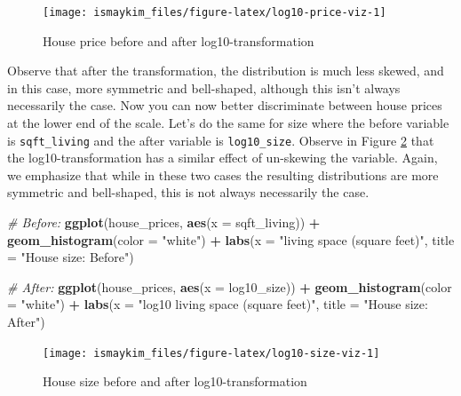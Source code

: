 \documentclass[12pt,]{krantz}
\makeatletter
\newenvironment{Shaded}{\begin{snugshade}}{\end{snugshade}}
\newcommand{\KeywordTok}[1]{\textcolor[rgb]{0.27,0.27,0.27}{\textbf{#1}}}
\newcommand{\DataTypeTok}[1]{\textcolor[rgb]{0.27,0.27,0.27}{#1}}
\newcommand{\StringTok}[1]{\textcolor[rgb]{0.5,0.5,0.5}{#1}}
\newcommand{\CommentTok}[1]{\textcolor[rgb]{0.37,0.37,0.37}{\textit{#1}}}
\newcommand{\OperatorTok}[1]{\textcolor[rgb]{0.43,0.43,0.43}{\textbf{#1}}}
\newcommand{\NormalTok}[1]{#1}
\newenvironment{kframe}{%
\medskip{}
\setlength{\fboxsep}{.8em}
 \def\at@end@of@kframe{}%
 \ifinner\ifhmode%
  \def\at@end@of@kframe{\end{minipage}}%
  \begin{minipage}{\columnwidth}%
 \fi\fi%
 \def\FrameCommand##1{\hskip\@totalleftmargin \hskip-\fboxsep
 \colorbox{shadecolor}{##1}\hskip-\fboxsep
     \hskip-\linewidth \hskip-\@totalleftmargin \hskip\columnwidth}%
 \MakeFramed {\advance\hsize-\width
   \@totalleftmargin\z@ \linewidth\hsize
   \@setminipage}}%
 {\par\unskip\endMakeFramed%
 \at@end@of@kframe}
\renewenvironment{Shaded}{\begin{kframe}}{\end{kframe}}
\theoremstyle{definition}
\theoremstyle{definition}
\theoremstyle{definition}
\theoremstyle{remark}
\makeatother
\begin{document}
\begin{figure}

{\centering \texttt{[image: ismaykim\_files/figure-latex/log10-price-viz-1]} 

}

\caption{House price before and after log10-transformation}\label{fig:log10-price-viz}
\end{figure}

Observe that after the transformation, the distribution is much less
skewed, and in this case, more symmetric and bell-shaped, although this
isn't always necessarily the case. Now you can now better discriminate
between house prices at the lower end of the scale. Let's do the same
for size where the before variable is \texttt{sqft\_living} and the
after variable is \texttt{log10\_size}. Observe in Figure
\ref{fig:log10-size-viz} that the log10-transformation has a similar
effect of un-skewing the variable. Again, we emphasize that while in
these two cases the resulting distributions are more symmetric and
bell-shaped, this is not always necessarily the case.

\begin{Shaded}
\begin{Highlighting}[]
\CommentTok{# Before:}
\KeywordTok{ggplot}\NormalTok{(house_prices, }\KeywordTok{aes}\NormalTok{(}\DataTypeTok{x =}\NormalTok{ sqft_living)) }\OperatorTok{+}
\StringTok{  }\KeywordTok{geom_histogram}\NormalTok{(}\DataTypeTok{color =} \StringTok{"white"}\NormalTok{) }\OperatorTok{+}
\StringTok{  }\KeywordTok{labs}\NormalTok{(}\DataTypeTok{x =} \StringTok{"living space (square feet)"}\NormalTok{, }\DataTypeTok{title =} \StringTok{"House size: Before"}\NormalTok{)}

\CommentTok{# After:}
\KeywordTok{ggplot}\NormalTok{(house_prices, }\KeywordTok{aes}\NormalTok{(}\DataTypeTok{x =}\NormalTok{ log10_size)) }\OperatorTok{+}
\StringTok{  }\KeywordTok{geom_histogram}\NormalTok{(}\DataTypeTok{color =} \StringTok{"white"}\NormalTok{) }\OperatorTok{+}
\StringTok{  }\KeywordTok{labs}\NormalTok{(}\DataTypeTok{x =} \StringTok{"log10 living space (square feet)"}\NormalTok{, }\DataTypeTok{title =} \StringTok{"House size: After"}\NormalTok{)}
\end{Highlighting}
\end{Shaded}

\begin{figure}

{\centering \texttt{[image: ismaykim\_files/figure-latex/log10-size-viz-1]} 

}

\caption{House size before and after log10-transformation}\label{fig:log10-size-viz}
\end{figure}
\end{document}
